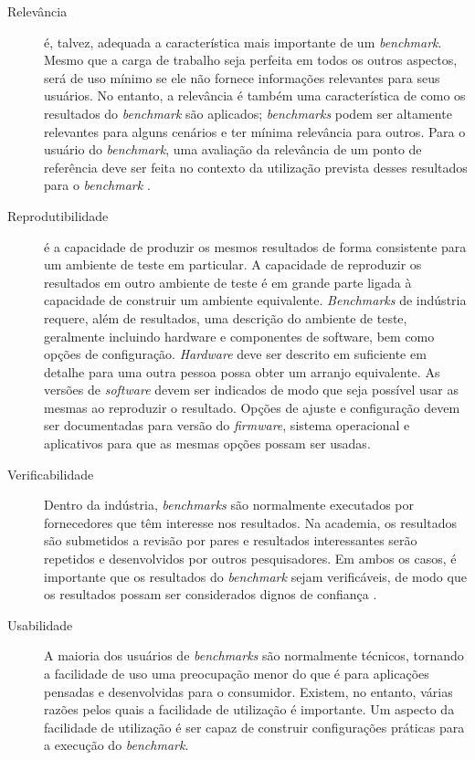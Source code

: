 \begin{description}
	\item[Relevância] é, talvez, adequada a característica mais importante de um \textit{benchmark}. Mesmo que a carga de trabalho seja perfeita em todos os outros aspectos, será de uso mínimo se ele não fornece informações relevantes para seus usuários. No entanto, a relevância é também uma característica de como os resultados do \textit{benchmark} são aplicados; \textit{benchmarks} podem ser altamente relevantes para alguns cenários e ter mínima relevância para outros. Para o usuário do \textit{benchmark}, uma avaliação da relevância de um ponto de referência deve ser feita no contexto da utilização prevista desses resultados para o \textit{benchmark} \cite{Kistowski2015}. 
	
	\item[Reprodutibilidade] é a capacidade de produzir os mesmos resultados de forma consistente para um ambiente de teste em particular. A capacidade de reproduzir os resultados em outro ambiente de teste é em grande parte ligada à capacidade de construir um ambiente equivalente. \textit{Benchmarks} de indústria requere, além de resultados, uma descrição do ambiente de teste, geralmente incluindo hardware e componentes de software, bem como opções de configuração. \textit{Hardware} deve ser descrito em suficiente em detalhe para uma outra pessoa possa obter um arranjo equivalente. As versões de \textit{software} devem ser indicados de modo que seja possível usar as mesmas ao reproduzir o resultado. Opções de ajuste e configuração devem ser documentadas para versão do \textit{firmware}, sistema operacional e aplicativos para que as mesmas opções possam ser usadas. \cite{Kistowski2015}
	
	\item[Verificabilidade] Dentro da indústria, \textit{benchmarks} são normalmente executados por fornecedores que têm interesse nos resultados. Na academia, os resultados são submetidos a revisão por pares e resultados interessantes serão repetidos e desenvolvidos por outros pesquisadores. Em ambos os casos, é importante que os resultados do \textit{benchmark} sejam verificáveis, de modo que os resultados possam ser considerados dignos de confiança \cite{Kistowski2015}. 
	
	\item[Usabilidade] A maioria dos usuários de \textit{benchmarks} são normalmente técnicos, tornando a facilidade de uso uma preocupação menor do que é para aplicações pensadas e desenvolvidas para o consumidor. Existem, no entanto, várias razões pelos quais a facilidade de utilização é importante.
	Um aspecto da facilidade de utilização é ser capaz de construir configurações práticas para a execução do \textit{benchmark}. 
	

\end{description}
